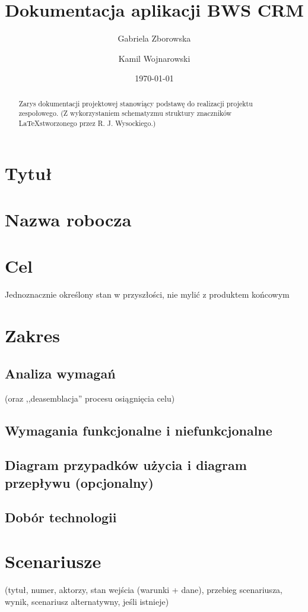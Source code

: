 \documentclass[12pt,a4paper]{article}
\begin{document}
\title{Dokumentacja aplikacji BWS CRM}
\author{Gabriela Zborowska \and Kamil Wojnarowski}
\date{\today}

\maketitle

\begin{abstract}
Zarys dokumentacji projektowej stanowiący podstawę do realizacji projektu zespołowego. (Z wykorzystaniem schematyzmu struktury znaczników \LaTeX  stworzonego przez R. J. Wysockiego.)
\end{abstract}

\newpage

\tableofcontents
\listoftables
\listoffigures

\newpage

\section{Tytuł}
\section{Nazwa robocza}
\section{Cel}
Jednoznacznie określony stan w przyszłości, nie mylić z produktem końcowym
\section{Zakres}
\subsection{Analiza wymagań}
 (oraz ,,deasemblacja'' procesu osiągnięcia celu)
\subsection{Wymagania funkcjonalne i niefunkcjonalne}
\subsection{Diagram przypadków użycia i diagram przepływu (opcjonalny)}
\subsection{Dobór technologii}
\section{Scenariusze}
(tytuł, numer, aktorzy, stan wejścia (warunki + dane), przebieg scenariusza, wynik, scenariusz alternatywny, jeśli istnieje)
\end{document}
